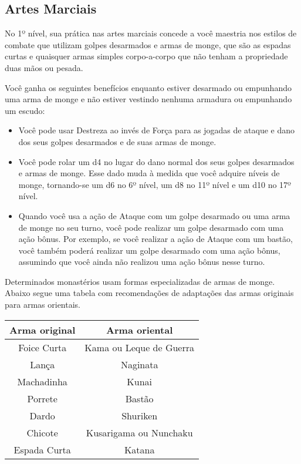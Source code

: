 \begin{multicols}{2}
\section*{Artes Marciais}%

No 1º nível, sua prática nas artes marciais concede a você maestria nos estilos
de combate que utilizam golpes desarmados e armas de monge, que são as espadas
curtas e quaisquer armas simples corpo-a-corpo que não tenham a propriedade duas
mãos ou pesada.

Você ganha os seguintes benefícios enquanto estiver desarmado ou empunhando uma
arma de monge e não estiver vestindo nenhuma armadura ou empunhando um escudo:

\begin{itemize}
    \item Você pode usar Destreza ao invés de Força para as jogadas de ataque e
        dano dos seus golpes desarmados e de suas armas de monge.
    \item Você pode rolar um d4 no lugar do dano normal dos seus golpes
        desarmados e armas de monge. Esse dado muda à medida que você adquire
        níveis de monge, tornando-se um d6 no 6º nível, um d8 no 11º nível e um
        d10 no 17º nível.
    \item Quando você usa a ação de Ataque com um golpe desarmado ou uma arma de
        monge no seu turno, você pode realizar um golpe desarmado com uma ação
        bônus. Por exemplo, se você realizar a ação de Ataque com um bastão,
        você também poderá realizar um golpe desarmado com uma ação bônus,
        assumindo que você ainda não realizou uma ação bônus nesse turno.
\end{itemize}

Determinados monastérios usam formas especializadas de armas de monge. Abaixo
segue uma tabela com recomendações de adaptações das armas originais para armas
orientais.

\begin{center}
\begin{tabular}{c | c}
\textbf{Arma original} & \textbf{Arma oriental} \\ \hline
Foice Curta & Kama ou Leque de Guerra \\
Lança & Naginata \\
Machadinha & Kunai \\
Porrete & Bastão \\
Dardo & Shuriken \\
Chicote & Kusarigama ou Nunchaku \\
Espada Curta & Katana \\
\end{tabular}
\end{center}


\end{multicols}

